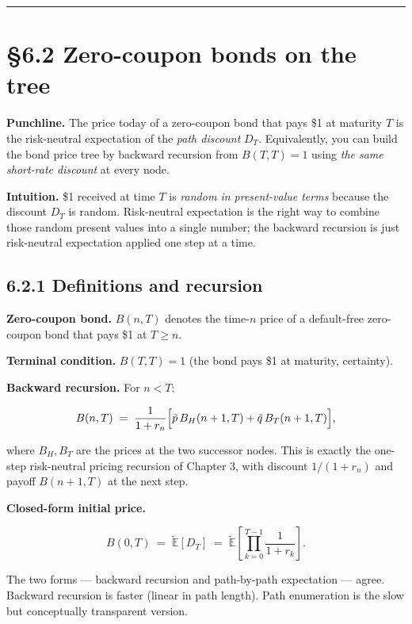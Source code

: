 \documentclass[
  10pt,
  twoside]{book}
\begin{document}
\begin{center}\rule{0.5\linewidth}{0.5pt}\end{center}

\section{§6.2 Zero-coupon bonds on the
tree}\label{zero-coupon-bonds-on-the-tree}

\textbf{Punchline.} The price today of a zero-coupon bond that pays \$1
at maturity \(T\) is the risk-neutral expectation of the \emph{path
discount} \(D_T\). Equivalently, you can build the bond price tree by
backward recursion from \(B(T, T) = 1\) using \emph{the same short-rate
discount} at every node.

\textbf{Intuition.} \$1 received at time \(T\) is \emph{random in
present-value terms} because the discount \(D_T\) is random.
Risk-neutral expectation is the right way to combine those random
present values into a single number; the backward recursion is just
risk-neutral expectation applied one step at a time.

\subsection{6.2.1 Definitions and
recursion}\label{definitions-and-recursion}

\textbf{Zero-coupon bond.} \(B(n, T)\) denotes the time-\(n\) price of a
default-free zero-coupon bond that pays \$1 at \(T \ge n\).

\textbf{Terminal condition.} \(B(T, T) = 1\) (the bond pays \$1 at
maturity, certainty).

\textbf{Backward recursion.} For \(n < T\):

\[B(n, T) \;=\; \frac{1}{1 + r_n}\Bigl[\tilde p \, B_H(n+1, T) + \tilde q \, B_T(n+1, T)\Bigr],\]

where \(B_H, B_T\) are the prices at the two successor nodes. This is
exactly the one-step risk-neutral pricing recursion of Chapter 3, with
discount \(1/(1+r_n)\) and payoff \(B(n+1, T)\) at the next step.

\textbf{Closed-form initial price.}

\[B(0, T) \;=\; \tilde{\mathbb E}\!\left[D_T\right] \;=\; \tilde{\mathbb E}\!\left[\prod_{k=0}^{T-1}\frac{1}{1 + r_k}\right].\]

The two forms --- backward recursion and path-by-path expectation ---
agree. Backward recursion is faster (linear in path length). Path
enumeration is the slow but conceptually transparent version.
\end{document}
